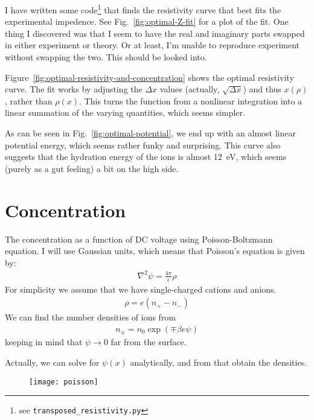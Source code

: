 \documentclass[twocolumn]{revtex4-1}
\begin{document}
I have written some code\footnote{see \texttt{transposed\_resistivity.py}} that
finds the resistivity curve that best fits the experimental
impedence.  See Fig.~\ref{fig:optimal-Z-fit} for a plot of the fit.
One thing I discovered was that I seem to have the real and imaginary
parts swapped in either experiment or theory.  Or at least, I'm unable
to reproduce experiment without swapping the two.  This should be
looked into.

Figure~\ref{fig:optimal-resistivity-and-concentration} shows the
optimal resistivity curve.  The fit works by adjusting the $\Delta x$
values (actually, $\sqrt{\Delta x}$) and thus $x(\rho)$, rather than
$\rho(x)$.  This turns the function from a nonlinear integration into
a linear summation of the varying quantities, which seems simpler.

As can be seen in Fig.~\ref{fig:optimal-potential}, we end up with an
almost linear potential energy, which seems rather funky and
surprising.  This curve also suggests that the hydration energy of the
ions is almost 12~eV, which seems (purely as a gut feeling) a bit on
the high side.

\clearpage

\appendix

\section{Concentration}

The concentration as a function of DC voltage using Poisson-Boltzmann
equation.  I will use Gaussian units, which means that Poisson's
equation is given by:
\begin{align}
  \nabla^2 \psi = \frac{4\pi}{\epsilon} \rho
\end{align}
For simplicity we assume that we have single-charged cations and
anions.
\begin{align}
  \rho = e (n_{+} - n_{-})
\end{align}
We can find the number densities of ions from
\begin{align}
  n_{\pm} = n_0 \exp(\mp\beta e \psi)
\end{align}
keeping in mind that $\psi\rightarrow 0$ far from the surface.

Actually, we can solve for $\psi(x)$ analytically, and from that
obtain the densities.

\begin{figure}
  \texttt{[image: poisson]}
\end{figure}
\end{document}
